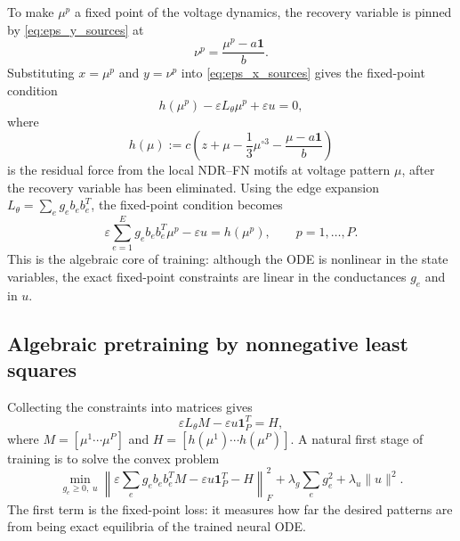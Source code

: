 \documentclass[11pt]{article}
\begin{document}
To make $\mu^p$ a fixed point of the voltage dynamics, the recovery
variable is pinned by \eqref{eq:eps_y_sources} at
\begin{equation}
  \nu^p=\frac{\mu^p-a\mathbf{1}}{b}.
  \label{eq:target_recovery_memory}
\end{equation}
Substituting $x=\mu^p$ and $y=\nu^p$ into \eqref{eq:eps_x_sources}
gives the fixed-point condition
\begin{equation}
  h(\mu^p)-\varepsilon L_\theta\mu^p+\varepsilon u=0,
  \label{eq:fixed_point_memory_condition}
\end{equation}
where
\begin{equation}
  h(\mu)
  :=
  c\!\left(
    z+\mu-\frac{1}{3}\mu^{\circ 3}
    -
    \frac{\mu-a\mathbf{1}}{b}
  \right)
  \label{eq:local_force_h}
\end{equation}
is the residual force from the local NDR--FN motifs at voltage pattern
$\mu$, after the recovery variable has been eliminated. Using the edge
expansion $L_\theta = \sum_{e} g_e b_e b_e^T$, the fixed-point
condition becomes
\begin{equation}
  \varepsilon
  \sum_{e=1}^E
  g_e b_e b_e^T\mu^p
  -
  \varepsilon u
  =
  h(\mu^p),
  \qquad
  p=1,\ldots,P.
  \label{eq:linear_memory_constraints}
\end{equation}
This is the algebraic core of training: although the ODE is nonlinear
in the state variables, the exact fixed-point constraints are linear in
the conductances $g_e$ and in $u$.

\subsection{Algebraic pretraining by nonnegative least squares}

Collecting the constraints into matrices gives
\begin{equation}
  \varepsilon L_\theta M-\varepsilon u\mathbf{1}_P^T=H,
  \label{eq:matrix_memory_constraint}
\end{equation}
where $M = [\mu^1\cdots\mu^P]$ and $H = [h(\mu^1)\cdots h(\mu^P)]$.
A natural first stage of training is to solve the convex problem
\begin{equation}
  \min_{g_e\geq 0,\;u}
  \left\|
    \varepsilon
    \sum_{e}
    g_e b_e b_e^T M
    -
    \varepsilon u\mathbf{1}_P^T
    -
    H
  \right\|_F^2
  +
  \lambda_g\sum_{e} g_e^2
  +
  \lambda_u\|u\|^2.
  \label{eq:nnls_memory_training}
\end{equation}
The first term is the fixed-point loss: it measures how far the desired
patterns are from being exact equilibria of the trained neural ODE.
\end{document}
